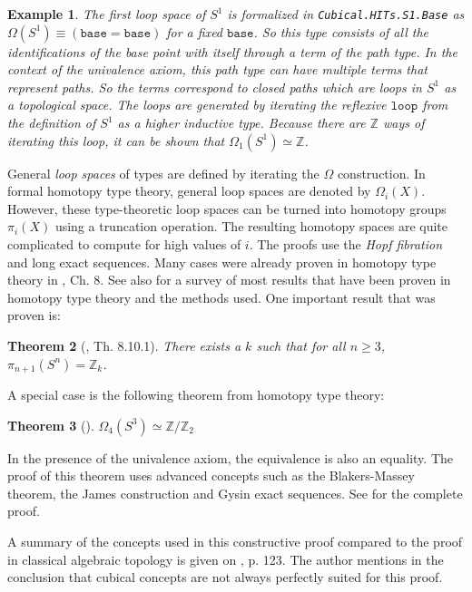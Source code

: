 \documentclass[12pt,a4paper,twoside,xetex]{book} %
\newcommand{\keyword}[1]{\emph{#1}\index{#1}}
\newtheorem{theorem}{Theorem}[section]
\newtheorem{example}[theorem]{Example}
\newcommand{\op}[1]{\mathtt{#1}}
\begin{document}
\begin{example}
The first loop space of $S^1$ is formalized in \texttt{Cubical.HITs.S1.Base} 
as $\Omega (S^1) \equiv (\op{base} = \op{base})$ for a fixed
$\op{base}$. So this type consists of all the identifications of the base 
point with itself through a term of the path type. In the context of the 
univalence axiom, this path type can have multiple terms that represent paths. 
So the terms correspond to closed paths which are loops in $S^1$ as a 
topological space. The loops are generated by iterating the reflexive 
$\op{loop}$ from the definition of $S^1$ as a higher inductive type. Because 
there are $\mathbb{Z}$ ways of iterating this loop, it can be shown that 
$\Omega_1 (S^1) \simeq \mathbb{Z}$. 
\end{example}


General \keyword{loop spaces} of types 
are defined by iterating the $\Omega$ construction. In formal homotopy type 
theory, general loop spaces are denoted by $\Omega_i (X)$. However, these type-theoretic loop spaces can be turned into homotopy groups $\pi_i(X)$ using a truncation operation. 
The resulting homotopy spaces are quite complicated to compute for high values of $i$. The proofs use the \keyword{Hopf fibration} and long exact sequences. Many cases were already proven in homotopy type theory in \cite{Voevodsky2013}, Ch. 8. See also \cite{Licata2013May} for a survey of most results that have been proven in 
homotopy type theory and the methods used. One important result that was proven 
is:

\begin{theorem}[\cite{Voevodsky2013}, Th. 8.10.1]
 There exists a $k$ such that for all $n \geq 3$, $\pi_{n+1}(S^n) = 
\mathbb{Z}_k$.
\end{theorem}

A special case is the following theorem from homotopy type theory:

\begin{theorem}[\cite{Brunerie2016}]
$\Omega_4 ( S^3 ) \simeq \mathbb{Z} / \mathbb{Z}_2$
\end{theorem}

In the presence of the univalence axiom, the equivalence is also an equality. The proof of this theorem uses advanced concepts such as the Blakers-Massey 
theorem, the James construction and Gysin exact sequences. See 
\cite{Brunerie2016} for the complete proof.

A summary of the concepts used in this constructive proof compared to the proof 
in classical algebraic topology is given on \cite{Brunerie2016}, p. 123. The 
author mentions in the conclusion that cubical concepts are not always perfectly 
suited for this proof. 
\end{document}
